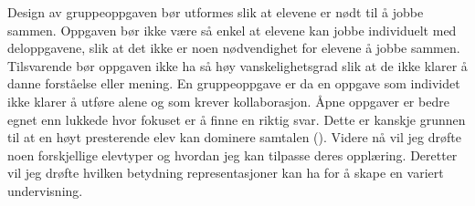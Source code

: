\documentclass[main.tex]{subfiles}
\begin{document}
Design av gruppeoppgaven bør utformes slik at elevene er nødt til å jobbe sammen. Oppgaven bør ikke være så enkel at elevene kan jobbe individuelt med deloppgavene, slik at det ikke er noen nødvendighet for elevene å jobbe sammen. Tilsvarende bør oppgaven ikke ha så høy vanskelighetsgrad slik at de ikke klarer å danne forståelse eller mening. En gruppeoppgave er da en oppgave som individet ikke klarer å utføre alene og som krever kollaborasjon. Åpne oppgaver er bedre egnet enn lukkede hvor fokuset er å finne en riktig svar. Dette er kanskje grunnen til at en høyt presterende elev kan dominere samtalen ().
\newline\newline
Videre nå vil jeg drøfte noen forskjellige elevtyper og hvordan jeg kan tilpasse deres opplæring. Deretter vil jeg drøfte hvilken betydning representasjoner kan ha for å skape en variert undervisning.
\end{document}
